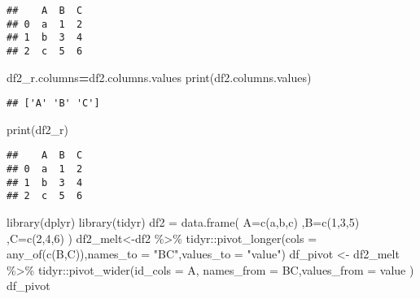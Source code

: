 \documentclass[
]{article}
\newenvironment{Shaded}{\begin{snugshade}}{\end{snugshade}}
\newcommand{\AttributeTok}[1]{\textcolor[rgb]{0.77,0.63,0.00}{#1}}
\newcommand{\BuiltInTok}[1]{#1}
\newcommand{\DecValTok}[1]{\textcolor[rgb]{0.00,0.00,0.81}{#1}}
\newcommand{\FunctionTok}[1]{\textcolor[rgb]{0.00,0.00,0.00}{#1}}
\newcommand{\NormalTok}[1]{#1}
\newcommand{\OperatorTok}[1]{\textcolor[rgb]{0.81,0.36,0.00}{\textbf{#1}}}
\newcommand{\OtherTok}[1]{\textcolor[rgb]{0.56,0.35,0.01}{#1}}
\newcommand{\SpecialCharTok}[1]{\textcolor[rgb]{0.00,0.00,0.00}{#1}}
\newcommand{\StringTok}[1]{\textcolor[rgb]{0.31,0.60,0.02}{#1}}
\begin{document}
\begin{verbatim}
##    A  B  C
## 0  a  1  2
## 1  b  3  4
## 2  c  5  6
\end{verbatim}

\begin{Shaded}
\begin{Highlighting}[]
\NormalTok{df2\_r.columns}\OperatorTok{=}\NormalTok{df2.columns.values}
\BuiltInTok{print}\NormalTok{(df2.columns.values)}
\end{Highlighting}
\end{Shaded}

\begin{verbatim}
## ['A' 'B' 'C']
\end{verbatim}

\begin{Shaded}
\begin{Highlighting}[]
\BuiltInTok{print}\NormalTok{(df2\_r)}
\end{Highlighting}
\end{Shaded}

\begin{verbatim}
##    A  B  C
## 0  a  1  2
## 1  b  3  4
## 2  c  5  6
\end{verbatim}

\begin{Shaded}
\begin{Highlighting}[]
\FunctionTok{library}\NormalTok{(dplyr)}
\FunctionTok{library}\NormalTok{(tidyr)}
\NormalTok{df2 }\OtherTok{=} \FunctionTok{data.frame}\NormalTok{(}
  \AttributeTok{A=}\FunctionTok{c}\NormalTok{(}\StringTok{\textquotesingle{}a\textquotesingle{}}\NormalTok{,}\StringTok{\textquotesingle{}b\textquotesingle{}}\NormalTok{,}\StringTok{\textquotesingle{}c\textquotesingle{}}\NormalTok{)}
\NormalTok{  ,}\AttributeTok{B=}\FunctionTok{c}\NormalTok{(}\DecValTok{1}\NormalTok{,}\DecValTok{3}\NormalTok{,}\DecValTok{5}\NormalTok{)}
\NormalTok{  ,}\AttributeTok{C=}\FunctionTok{c}\NormalTok{(}\DecValTok{2}\NormalTok{,}\DecValTok{4}\NormalTok{,}\DecValTok{6}\NormalTok{)}
\NormalTok{)}
\NormalTok{df2\_melt}\OtherTok{\textless{}{-}}\NormalTok{df2 }\SpecialCharTok{\%\textgreater{}\%}
\NormalTok{  tidyr}\SpecialCharTok{::}\FunctionTok{pivot\_longer}\NormalTok{(}\AttributeTok{cols =} \FunctionTok{any\_of}\NormalTok{(}\FunctionTok{c}\NormalTok{(}\StringTok{\textquotesingle{}B\textquotesingle{}}\NormalTok{,}\StringTok{\textquotesingle{}C\textquotesingle{}}\NormalTok{)),}\AttributeTok{names\_to =} \StringTok{"BC"}\NormalTok{,}\AttributeTok{values\_to  =} \StringTok{"value"}\NormalTok{)}
\NormalTok{df\_pivot }\OtherTok{\textless{}{-}}\NormalTok{ df2\_melt }\SpecialCharTok{\%\textgreater{}\%}
\NormalTok{  tidyr}\SpecialCharTok{::}\FunctionTok{pivot\_wider}\NormalTok{(}\AttributeTok{id\_cols =}\NormalTok{ A, }\AttributeTok{names\_from =}\NormalTok{ BC,}\AttributeTok{values\_from =}\NormalTok{ value )}
\NormalTok{df\_pivot}
\end{Highlighting}
\end{Shaded}
\end{document}

